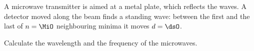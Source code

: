 A microwave transmitter is aimed at a metal plate, which reflects the waves. A detector moved along the beam finds a standing wave: between the first and the last of $n = \MiO$ neighbouring minima it moves $d = \dsO$.

Calculate the wavelength and the frequency of the microwaves.
